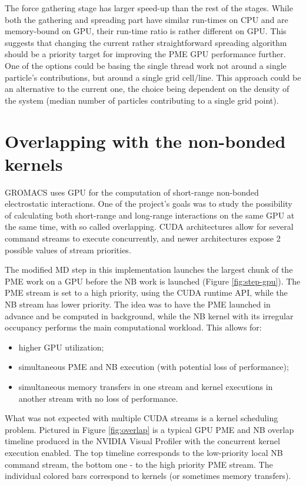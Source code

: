 \documentclass[12pt,a4paper,notitlepage]{report}
\begin{document}
The force gathering stage has larger speed-up than the rest of the stages. While both the gathering and spreading part have similar run-times on CPU and are memory-bound on GPU, their run-time ratio is rather different on GPU. This suggests that changing the current rather straightforward spreading algorithm should be a priority target for improving the PME GPU performance further. One of the options could be basing the single thread work not around a single particle's contributions, but around a single grid cell/line. This approach could be an alternative to the current one, the choice being dependent on the density of the system (median number of particles contributing to a single grid point).

\section{Overlapping with the non-bonded kernels}\label{overlapped}

GROMACS uses GPU for the computation of short-range non-bonded electrostatic interactions. One of the project's goals was to study the possibility of calculating both short-range and long-range interactions on the same GPU at the same time, with so called overlapping. CUDA architectures allow for several command streams to execute concurrently, and newer architectures expose 2 possible values of stream priorities. 

The modified MD step in this implementation launches the largest chunk of the PME work on a GPU before the NB work is launched (Figure \ref{fig:step-gpu}). The PME stream is set to a high priority, using the CUDA runtime API, while the NB stream has lower priority. 
The idea was to have the PME launched in advance and be computed in background, while the NB kernel with its irregular occupancy performs the main computational workload. This allows for:
\begin{itemize}
\item higher GPU utilization;
\item simultaneous PME and NB execution (with potential loss of performance);
\item simultaneous memory transfers in one stream and kernel executions in another stream with no loss of performance.
\end{itemize}

What was not expected with multiple CUDA streams is a kernel scheduling problem. Pictured in Figure \ref{fig:overlap} is a typical GPU PME and NB overlap timeline produced in the NVIDIA Visual Profiler with the concurrent kernel execution enabled.
The top timeline corresponds to the low-priority local NB command stream, the bottom one - to the high priority PME stream. The individual colored bars correspond to kernels (or sometimes memory transfers). 
\end{document}
